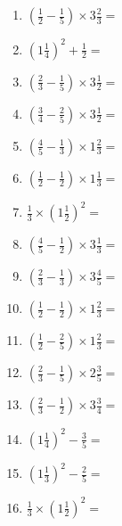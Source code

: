 \documentclass[12pt]{article}
\begin{document}
\begin{enumerate}
\newpage
\item \large $ \left( \frac{1}{2} - \frac{1}{5} \right) \times 3 \frac{2}{3} = $ \vspace{1.6cm}
\item \large $ \left( 1 \frac{1}{4} \right)^2 + \frac{1}{2} = $ \vspace{1.6cm}
\item \large $ \left( \frac{2}{3} - \frac{1}{5} \right) \times 3 \frac{1}{2} = $ \vspace{1.6cm}
\item \large $ \left( \frac{3}{4} - \frac{2}{5} \right) \times 3 \frac{1}{2} = $ \vspace{1.6cm}
\item \large $ \left( \frac{4}{5} - \frac{1}{3} \right) \times 1 \frac{2}{3} = $ \vspace{1.6cm}
\item \large $ \left( \frac{1}{2} - \frac{1}{2} \right) \times 1 \frac{1}{3} = $ \vspace{1.6cm}
\item \large $ \frac{1}{3} \times \left( 1 \frac{1}{2} \right)^2 = $ \vspace{1.6cm}
\item \large $ \left( \frac{4}{5} - \frac{1}{2} \right) \times 3 \frac{1}{3} = $ \vspace{1.6cm}
\item \large $ \left( \frac{2}{3} - \frac{1}{3} \right) \times 3 \frac{4}{5} = $ \vspace{1.6cm}
\item \large $ \left( \frac{1}{2} - \frac{1}{2} \right) \times 1 \frac{2}{3} = $ \vspace{1.6cm}
\newpage
\item \large $ \left( \frac{1}{2} - \frac{2}{5} \right) \times 1 \frac{2}{3} = $ \vspace{1.6cm}
\item \large $ \left( \frac{2}{3} - \frac{1}{5} \right) \times 2 \frac{3}{5} = $ \vspace{1.6cm}
\item \large $ \left( \frac{2}{3} - \frac{1}{2} \right) \times 3 \frac{3}{4} = $ \vspace{1.6cm}
\item \large $ \left( 1 \frac{1}{4} \right)^2 - \frac{3}{5} = $ \vspace{1.6cm}
\item \large $ \left( 1 \frac{1}{3} \right)^2 - \frac{2}{5} = $ \vspace{1.6cm}
\item \large $ \frac{1}{3} \times \left( 1 \frac{1}{2} \right)^2 = $ \vspace{1.6cm}

\end{enumerate}
\end{document}
